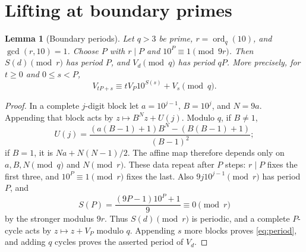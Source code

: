\documentclass[10pt]{article}
\newtheorem{lemma}{Lemma}
\begin{document}
\section{Lifting at boundary primes}
\begin{lemma}[Boundary periods]\label{lem:period}
Let $q>3$ be prime, $r=\operatorname{ord}_q(10)$, and $\gcd(r,10)=1$.
Choose $P$ with $r\mid P$ and $10^P\equiv1\pmod{9r}$.
Then $S(d)\pmod r$ has period $P$, and $V_d\pmod q$ has period $qP$.
More precisely, for $t\ge0$ and $0\le s<P$,
\begin{equation}\label{eq:period}
 V_{tP+s}\equiv tV_P10^{S(s)}+V_s\pmod q.
\end{equation}
\end{lemma}
\begin{proof}
In a complete $j$-digit block let $a=10^{j-1}$, $B=10^j$, and $N=9a$.
Appending that block acts by $z\mapsto B^Nz+U(j)$. Modulo $q$, if $B\ne1$,
\begin{equation}\label{eq:block-character}
 U(j)=\frac{(a(B-1)+1)B^N-(B(B-1)+1)}{(B-1)^2};
\end{equation}
if $B=1$, it is $Na+N(N-1)/2$. The affine map therefore depends only on
$a,B,N\pmod q$ and $N\pmod r$. These data repeat after $P$ steps:
$r\mid P$ fixes the first three, and $10^P\equiv1\pmod r$ fixes the last.
Also $9j10^{j-1}\pmod r$ has period $P$, and
\[
 S(P)=\frac{(9P-1)10^P+1}{9}\equiv0\pmod r
\]
by the stronger modulus $9r$. Thus $S(d)\pmod r$ is periodic, and a complete
$P$-cycle acts by $z\mapsto z+V_P$ modulo $q$.
Appending $s$ more blocks proves \eqref{eq:period}, and adding $q$ cycles
proves the asserted period of $V_d$.
\end{proof}
\end{document}
